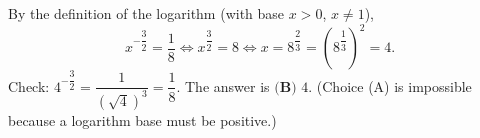 By the definition of the logarithm (with base $x>0$, $x\ne1$),
\[
x^{-\dfrac{3}{2}}=\dfrac{1}{8}\iff x^{\dfrac{3}{2}}=8\iff x=8^{\dfrac{2}{3}}=\left(8^{\dfrac{1}{3}}\right)^2=4 .
\]
Check: $4^{-\dfrac{3}{2}}=\dfrac{1}{\left(\sqrt4\right)^3}=\dfrac{1}{8}$. The answer is $\boxed{\textbf{(B) }4}$. (Choice (A) is impossible because a logarithm base must be positive.)
